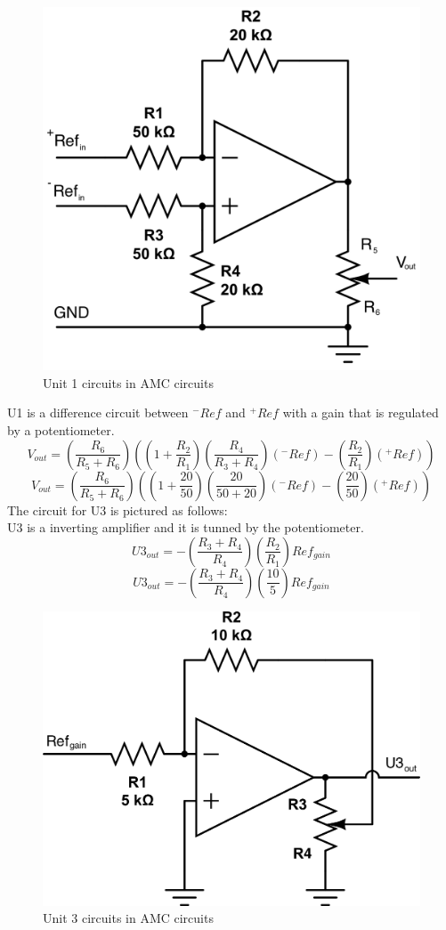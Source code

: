 \documentclass[letterpaper]{article}
\begin{document}
\begin{figure}[H]
	\centering
	\includegraphics[scale=0.15]{q1a_u1.png}
	\caption{Unit 1 circuits in AMC circuits}
\end{figure}
U1 is a difference circuit between $^-Ref$ and $^+Ref$ with a gain that is regulated by a potentiometer.
$$ V_{out} = \left( \frac{R_6}{R_5+R_6} \right) \left( \left(1 + \frac{R_2}{R_1} \right) \left( \frac{R_4}{R_3+R_4} \right) (^-Ref) - \left( \frac{R_2}{R_1} \right) (^+Ref) \right) $$
$$ V_{out} = \left( \frac{R_6}{R_5+R_6} \right) \left( \left(1+ \frac{20}{50} \right) \left( \frac{20}{50+20} \right)(^-Ref) - \left( \frac{20}{50} \right) (^+Ref) \right) $$
The circuit for U3 is pictured as follows:\\
U3 is a inverting amplifier and it is tunned by the potentiometer.
$$U3_{out} = - \left( \frac{R_3 + R_4}{R_4} \right) \left( \frac{R_2}{R_1} \right) Ref_{gain} $$
$$U3_{out} = - \left( \frac{R_3 + R_4}{R_4} \right) \left( \frac{10}{5} \right) Ref_{gain} $$
\begin{figure}[H]
	\centering
	\includegraphics[scale=0.15]{q1a_u3.png}
	\caption{Unit 3 circuits in AMC circuits}
\end{figure}
\end{document}
